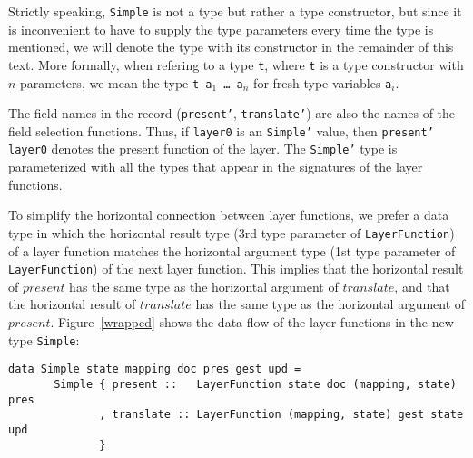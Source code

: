 \par  Strictly speaking, \texttt{Simple} is not a type but rather a type
      constructor, but since it is inconvenient to have to supply the type parameters
      every time the type is mentioned, we will denote the type with its constructor
      in the remainder of this text. More formally, when refering to a type
      \texttt{t}, where \texttt{t} is a type constructor with $n$ parameters, we mean
      the type \texttt{t a$_1$ \dots ~a$_n$} for fresh type variables
      \texttt{a$_i$}.
\par The field names in the record (\texttt{present'}, \texttt{translate'})
      are also the names of the field selection functions. Thus, if \texttt{layer0}
      is an \texttt{Simple'} value, then \texttt{present' layer0} denotes the present
      function of the layer. The \texttt{Simple'} type is parameterized with all the
      types that appear in the signatures of the layer functions.
\par To simplify the horizontal connection between layer functions, we prefer
      a data type in which the horizontal result type (3rd type parameter of
      \texttt{LayerFunction}) of a layer function matches the horizontal argument
      type (1st type parameter of \texttt{LayerFunction}) of the next layer function.
      This implies that the horizontal result of $present$ has the same type as the
      horizontal argument of $translate$, and that the horizontal result of
      $translate$ has the same type as the horizontal argument of $present$.
      Figure~\ref{wrapped} shows the data flow of the layer functions
      in the new type \texttt{Simple}:\begin{small}\begin{verbatim}data Simple state mapping doc pres gest upd =
       Simple { present ::   LayerFunction state doc (mapping, state) pres
              , translate :: LayerFunction (mapping, state) gest state upd
              }\end{verbatim}\end{small}

